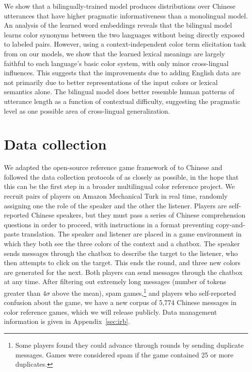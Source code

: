\documentclass[11pt,a4paper]{article}
\renewcommand{\|}{\mid}
\begin{document}
We show that a bilingually-trained model produces distributions over Chinese utterances that have higher pragmatic informativeness than a monolingual model.
An analysis of the learned word embeddings reveals that the bilingual model learns color synonyms between the two languages without being directly exposed to labeled pairs. However, using a context-independent color term elicitation task from \citet{BerlinKay1969} on our models, we show that the learned lexical meanings are largely faithful to each language's basic color system, with only minor cross-lingual influences. This suggests
that the improvements due to adding English data are not
primarily due to better representations of the input colors or lexical semantics alone.
The bilingual model does better resemble human patterns of utterance length
as a function of contextual difficulty, suggesting the
pragmatic level as one possible area of cross-lingual generalization.


\section{Data collection} \label{sec:data}

We adapted the open-source reference game framework of \citet{Hawkins15_RealTimeWebExperiments} to Chinese and followed the data collection protocols of \citet{Monroe2017} as closely as possible, in the hope that this can be the first step in a broader multilingual color reference project. We recruit pairs of players on Amazon Mechanical Turk in real time, randomly assigning one the role of the speaker and the other the listener. Players are self-reported Chinese speakers, but they must pass a series of Chinese comprehension questions in order to proceed, with instructions in a format preventing copy-and-paste translation. The speaker and listener are placed in a game environment in which they both see the three colors of the context and a chatbox. The speaker sends messages through the chatbox to describe the target to the listener, who then attempts to click on the target. This ends the round, and three new colors are generated for the next. Both players can send messages through the chatbox at any time. After filtering out extremely long messages (number of tokens greater than $4\sigma$ above the mean), spam games,\footnote{Some players found they could advance through rounds by sending duplicate messages. Games were considered spam if the game contained 25 or more duplicates.} and players who self-reported confusion about the game, we have a new corpus of 5,774 Chinese messages in color reference games, which we will release publicly. Data management information is given in Appendix~\ref{sec:irb}.
\end{document}
